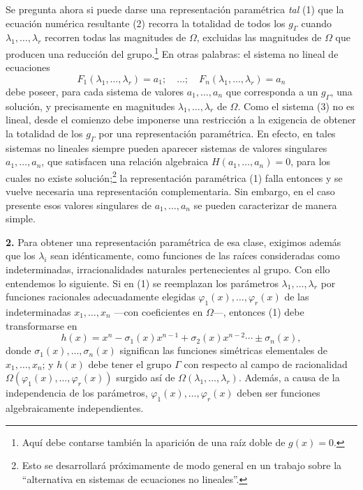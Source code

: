 \documentclass[11pt]{article}
\begin{document}
Se pregunta ahora si puede darse una representación paramétrica \emph{tal} (1) que la ecuación numérica resultante (2) recorra la totalidad de todos los $g_\Gamma$ cuando $\lambda_1,
\ldots,\lambda_r$ recorren todas las magnitudes de $\Omega$, excluidas las magnitudes de $\Omega$ que producen una reducción del grupo.\footnote{Aquí debe contarse también la aparición de una raíz doble de $g(x)=0$.} En otras palabras: el sistema no lineal de ecuaciones
\begin{equation}\tag{3}
F_1(\lambda_1,
\ldots,\lambda_r)=a_1;\quad \ldots;\quad F_n(\lambda_1,\ldots,\lambda_r)=a_n
\end{equation}
debe poseer, para cada sistema de valores $a_1,
\ldots,a_n$ que corresponda a un $g_\Gamma$, una solución, y precisamente en magnitudes $\lambda_1,
\ldots,\lambda_r$ de $\Omega$. Como el sistema (3) no es lineal, desde el comienzo debe imponerse una restricción a la exigencia de obtener la totalidad de los $g_\Gamma$ por una representación paramétrica. En efecto, en tales sistemas no lineales siempre pueden aparecer sistemas de valores singulares $a_1,
\ldots,a_n$, que satisfacen una relación algebraica $H(a_1,
\ldots,a_n)=0$, para los cuales no existe solución;\footnote{Esto se desarrollará próximamente de modo general en un trabajo sobre la ``alternativa en sistemas de ecuaciones no lineales''.} la representación paramétrica (1) falla entonces y se vuelve necesaria una representación complementaria. Sin embargo, en el caso presente esos valores singulares de $a_1,
\ldots,a_n$ se pueden caracterizar de manera simple.

\textbf{2.} Para obtener una representación paramétrica de esa clase, exigimos además que los $\lambda_i$ sean idénticamente, como funciones de las raíces consideradas como indeterminadas, irracionalidades naturales pertenecientes al grupo. Con ello entendemos lo siguiente. Si en (1) se reemplazan los parámetros $\lambda_1,
\ldots,\lambda_r$ por funciones racionales adecuadamente elegidas $\varphi_1(x),\ldots,\varphi_r(x)$ de las indeterminadas $x_1,
\ldots,x_n$ ---con coeficientes en $\Omega$---, entonces (1) debe transformarse en
\begin{equation}\tag{4}
h(x)=x^n-\sigma_1(x)x^{n-1}+\sigma_2(x)x^{n-2}\cdots \pm \sigma_n(x),
\end{equation}
donde $\sigma_1(x),\ldots,\sigma_n(x)$ significan las funciones simétricas elementales de $x_1,
\ldots,x_n$; y $h(x)$ debe tener el grupo $\Gamma$ con respecto al campo de racionalidad $\Omega(\varphi_1(x),\ldots,\varphi_r(x))$ surgido así de $\Omega(\lambda_1,
\ldots,\lambda_r)$. Además, a causa de la independencia de los parámetros, $\varphi_1(x),\ldots,\varphi_r(x)$ deben ser funciones algebraicamente independientes.
\end{document}
